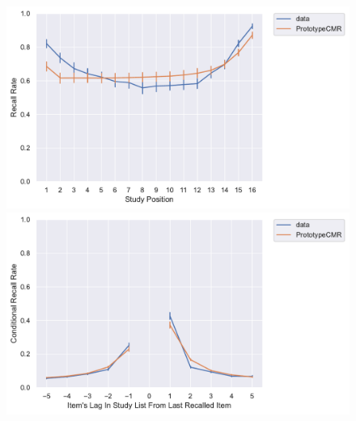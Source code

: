 \documentclass[
  letterpaper,
  DIV=11,
  numbers=noendperiod]{scrreport}
\begin{document}
\begin{figure}

\begin{minipage}[c]{0.33\linewidth}

{\centering 

\includegraphics{./figures/HealyKahana2014_PrototypeCMR_ll16_spc.pdf}

}

\end{minipage}%
%
\begin{minipage}[c]{0.33\linewidth}

{\centering 

\includegraphics{./figures/HealyKahana2014_PrototypeCMR_ll16_crp.pdf}

}

\end{minipage}%
%
\begin{minipage}[c]{0.33\linewidth}

{\centering 

}
\end{minipage}
\end{figure}
\end{document}
